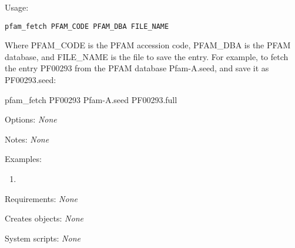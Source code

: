 \begin{description}


\item{Usage:}

{\tt pfam\_fetch PFAM\_CODE PFAM\_DBA FILE\_NAME}

 Where PFAM\_CODE is the PFAM accession code, PFAM\_DBA is
 the PFAM database, and FILE\_NAME is the file to save
 the entry. For example, to fetch the entry PF00293
 from the PFAM database Pfam-A.seed, and save it as
 PF00293.seed:

 pfam\_fetch PF00293 Pfam-A.seed PF00293.full


\item{Options:} {\em None}


\item{Notes:} {\em None}


\item{Examples:}
\begin{enumerate}

\item
\begin{verbatim}
\end{verbatim}

\end{enumerate}


\item{Requirements:} {\em None}


\item{Creates objects:} {\em None}


\item{System scripts:} {\em None}

\end{description}



\subsection[sprot\_split]{  }



